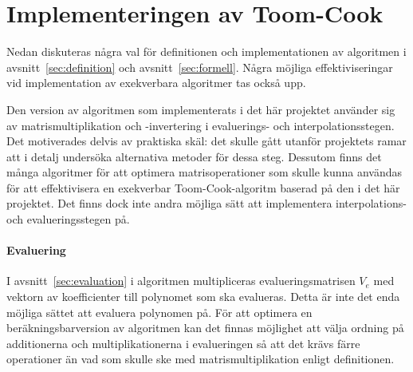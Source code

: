 \section{Implementeringen av Toom-Cook}

Nedan diskuteras några val för definitionen och implementationen av algoritmen i
avsnitt~\ref{sec:definition} och avsnitt~\ref{sec:formell}. Några möjliga
effektiviseringar vid implementation av exekverbara algoritmer tas också upp.

Den version av algoritmen som implementerats i det här projektet använder sig av
matrismultiplikation och -invertering i evaluerings- och interpolationsstegen.
Det motiverades delvis av praktiska skäl: det skulle gått utanför projektets
ramar att i detalj undersöka alternativa metoder för dessa steg.
Dessutom finns det många algoritmer för att optimera matrisoperationer som skulle kunna
användas för att effektivisera en exekverbar Toom-Cook-algoritm baserad på den i det här
projektet. Det finns dock inte andra möjliga sätt att implementera interpolations- och
evalueringsstegen på.




\paragraph{Evaluering}
I avsnitt~\ref{sec:evaluation} i algoritmen multipliceras
evalueringsmatrisen $V_e$ med vektorn av koefficienter till polynomet som ska
evalueras. Detta är inte det enda möjliga sättet att evaluera polynomen på.
För att optimera en beräkningsbarversion av algoritmen kan det finnas möjlighet att
välja ordning på additionerna och multiplikationerna i evalueringen så att det
krävs färre operationer än vad som skulle ske med matrismultiplikation enligt
definitionen\cite{bodrato2007towards}.

